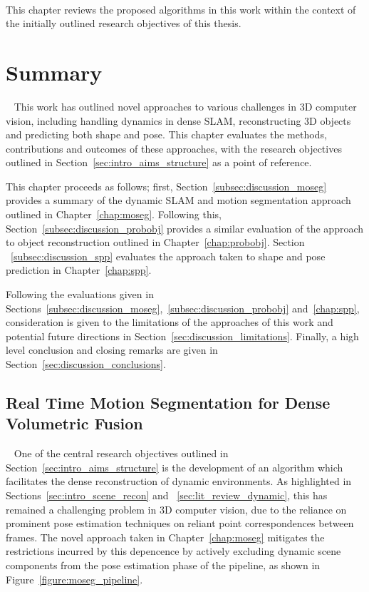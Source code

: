 ~\label{chap:discussion}
\begin{chapterabstract}
This chapter reviews the proposed algorithms in this work within the context 
of the initially outlined research objectives of this thesis.
\end{chapterabstract}

\section{Summary}
~\label{sec:discussion_summary}
This work has outlined novel approaches to various challenges in 3D computer vision, 
including handling dynamics in dense SLAM, reconstructing 3D objects and predicting both 
shape and pose. This chapter evaluates the methods, contributions and outcomes of these 
approaches, with the research objectives outlined in Section~\ref{sec:intro_aims_structure} 
as a point of reference.

This chapter proceeds as follows; first, Section~\ref{subsec:discussion_moseg} provides a 
summary of the dynamic SLAM and motion segmentation approach outlined in Chapter~\ref{chap:moseg}.
Following this, Section~\ref{subsec:discussion_probobj} provides a similar evaluation of the 
approach to object reconstruction outlined in Chapter~\ref{chap:probobj}. Section
~\ref{subsec:discussion_spp} evaluates the approach taken to shape and pose prediction in 
Chapter~\ref{chap:spp}.

Following the evaluations given in Sections~\ref{subsec:discussion_moseg},~\ref{subsec:discussion_probobj} 
and~\ref{chap:spp}, consideration is given to the limitations of the approaches of this work and potential 
future directions in Section~\ref{sec:discussion_limitations}. Finally, a high level conclusion and closing 
remarks are given in Section~\ref{sec:discussion_conclusions}.

\subsection{Real Time Motion Segmentation for Dense Volumetric Fusion}
~\label{subsec:discussion_moseg}
One of the central research objectives outlined in Section~\ref{sec:intro_aims_structure} 
is the development of an algorithm which facilitates the dense reconstruction of dynamic 
environments. As highlighted in Sections~\ref{sec:intro_scene_recon} and
~\ref{sec:lit_review_dynamic}, this has remained a challenging problem in 3D computer vision, 
due to the reliance on prominent pose estimation techniques on reliant point correspondences 
between frames. The novel approach taken in Chapter~\ref{chap:moseg} mitigates the restrictions 
incurred by this depencence by actively excluding dynamic scene components from the pose 
estimation phase of the pipeline, as shown in Figure~\ref{figure:moseg_pipeline}.

